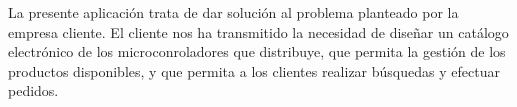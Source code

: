 La presente aplicación trata de dar solución al problema planteado por la empresa cliente.
El cliente nos ha transmitido la necesidad de diseñar un catálogo electrónico de los microconroladores que distribuye, que permita la gestión de los productos disponibles, y que permita a los clientes realizar búsquedas y efectuar pedidos.
